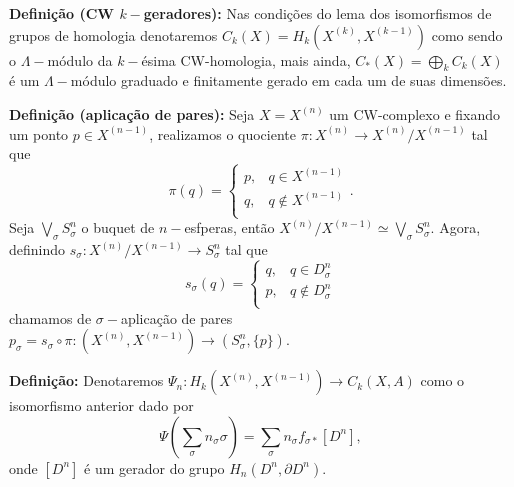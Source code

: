\documentclass[12pt]{book}
\newcommand{\celula}[2]{D^{#1}_{#2}}
\newcommand{\funcaocond}[5]{
	#1 = 
	\left\{
	\begin{array}{cc}
	#2, & #3\\
	#4, & #5\\
	\end{array}
	\right.
	}
\newcommand{\skeleton}[1]{X^{(#1)}}
\newcommand{\homologiarelcel}[3]{H_{#1}(D^{#2}_{#3}, \partial D^{#2}_{#3})}
\newcommand{\homologiarelskelesimpl}[2]{H_{#1}(X^{(#2)}, X^{(#2-1)})}
\newcommand{\somadir}[1]{\bigoplus \limits_{#1}}
\newcommand{\definicao}[1]{\vspace{2mm} \textbf{Definição:}{ #1}}
\newcommand{\definicaonomeada}[2]{\vspace{2mm} \textbf{Definição (#1):}{ #2}}
\begin{document}
	\definicaonomeada{CW $k-$geradores}{Nas condições do lema dos isomorfismos de grupos de homologia denotaremos $C_{k}(X)=\homologiarelskelesimpl{k}{k}$ como sendo o $\Lambda-$módulo da $k-$ésima CW-homologia, mais ainda, $C_{*}(X) = \somadir{k}C_{k}(X)$ é um $\Lambda-$módulo graduado e finitamente gerado em cada um de suas dimensões.}

	\definicaonomeada{aplicação de pares}{Seja $X = \skeleton{n}$ um CW-complexo e fixando um ponto $p \in \skeleton{n-1}$, realizamos o quociente $\pi : \skeleton{n} \to \skeleton{n}/\skeleton{n-1}$ tal que 	
	$$
		\pi(q) = 
		\left\{
		\begin{array}{cc}
		p, & q \in \skeleton{n-1}\\
		q, & q \notin \skeleton{n-1}\\
		\end{array}
		\right..
	$$
	Seja $\bigvee_{\sigma} S^{n}_{\sigma}$ o buquet de $n-$esfperas, então $\skeleton{n}/\skeleton{n-1} \simeq \bigvee_{\sigma} S^{n}_{\sigma}$. Agora, definindo $s_{\sigma} : \skeleton{n}/\skeleton{n-1} \to S^{n}_{\sigma}$ tal que 
	$$
	\funcaocond{s_{\sigma}(q)}{q}{q \in \celula{n}{\sigma}}{p}{q \notin \celula{n}{\sigma}}
	$$
	chamamos de $\sigma-$aplicação de pares $p_{\sigma} = s_{\sigma} \circ \pi : (\skeleton{n}, \skeleton{n-1}) \to (S^{n}_{\sigma}, \{p\})$.}
	
	\definicao{Denotaremos $\Psi_{n}:\homologiarelskelesimpl{k}{n} \to C_{k}(X,A)$ como o isomorfismo anterior dado por 
	$$
	\Psi(\sum_{\sigma} n_{\sigma} \sigma) = \sum_{\sigma} n_{\sigma} f_{\sigma *}[D^{n}],
	$$
	onde $[D^{n}]$ é um gerador do grupo $\homologiarelcel{n}{n}{}$.}
\end{document}
